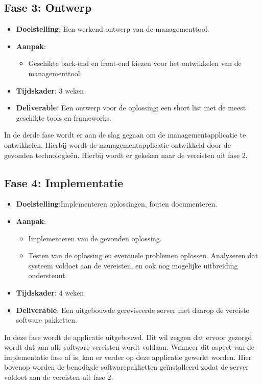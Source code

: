 \documentclass{hogent-article}
\begin{document}
\subsection*{Fase 3: Ontwerp}
\begin{itemize}
\item \textbf{Doelstelling}: Een werkend ontwerp van de managementtool.
\item \textbf{Aanpak}:
\begin{itemize}
\item Geschikte back-end en front-end kiezen voor het ontwikkelen van de managementtool.
\end{itemize}
\item \textbf{Tijdskader}: 3 weken
\item \textbf{Deliverable}: Een ontwerp voor de oplossing; een short list met de meest geschikte tools en frameworks.
\end{itemize}
\bigbreak
In de derde fase wordt er aan de slag gegaan om de managementapplicatie te ontwikkelen. Hierbij wordt de managementapplicatie ontwikkeld door de gevonden technologieën. Hierbij wordt er gekeken naar de vereisten uit fase 2.
\bigbreak
\subsection*{Fase 4: Implementatie}
\begin{itemize}
\item \textbf{Doelstelling}:Implementeren oplossingen, fouten documenteren.
\item \textbf{Aanpak}:
\begin{itemize}
\item Implementeren van de gevonden oplossing.
\item Testen van de oplossing en eventuele problemen oplossen. Analyseren dat systeem voldoet aan de vereisten, en ook nog mogelijke uitbreiding ondersteunt.
\end{itemize}
\item \textbf{Tijdskader}: 4 weken
\item \textbf{Deliverable}: Een uitgebouwde ge\-re\-vi\-seer\-de server met daarop de vereiste software pakketten.
\end{itemize}
\bigbreak
In deze fase wordt de applicatie uitgebouwd. Dit wil zeggen dat ervoor gezorgd wordt dat aan alle software vereisten wordt voldaan. Wanneer dit aspect van de implementatie fase af is, kan er verder op deze applicatie gewerkt worden. Hier bovenop worden de benodigde softwarepakketten geïnstalleerd zodat de server voldoet aan de vereisten uit fase 2.
\bigskip
\end{document}
